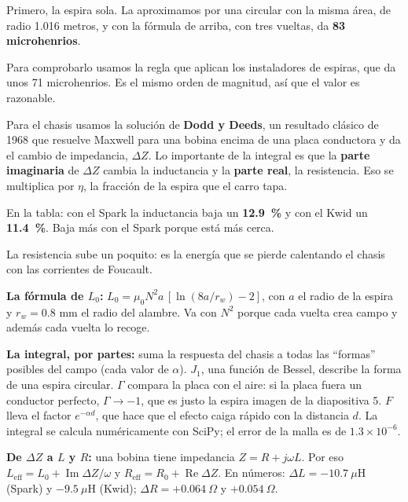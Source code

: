 \documentclass[11pt,a4paper]{article}
\begin{document}
Primero, la espira sola. La aproximamos por una circular con la misma área, de radio 1.016 metros, y con la
fórmula de arriba, con tres vueltas, da \textbf{83 microhenrios}.

\begin{opcional}
Para comprobarlo usamos la regla que aplican los instaladores de espiras, que da unos 71 microhenrios. Es el mismo
orden de magnitud, así que el valor es razonable.
\end{opcional}

Para el chasis usamos la solución de \textbf{Dodd y Deeds}, un resultado clásico de 1968 que resuelve Maxwell para
una bobina encima de una placa conductora y da el cambio de impedancia, $\Delta Z$. Lo importante de la integral es
que la \textbf{parte imaginaria} de $\Delta Z$ cambia la inductancia y la \textbf{parte real}, la resistencia. Eso
se multiplica por $\eta$, la fracción de la espira que el carro tapa.

En la tabla: con el Spark la inductancia baja un \textbf{12.9~\%} y con el Kwid un \textbf{11.4~\%}. Baja más con
el Spark porque está más cerca.

\begin{opcional}
La resistencia sube un poquito: es la energía que se pierde calentando el chasis con las corrientes de Foucault.
\end{opcional}

\begin{nota}
\textbf{La fórmula de $L_0$:} $L_0=\mu_0N^2a\,[\ln(8a/r_w)-2]$, con $a$ el radio de la espira y $r_w = 0.8$ mm el
radio del alambre. Va con $N^2$ porque cada vuelta crea campo y además cada vuelta lo recoge.

\textbf{La integral, por partes:} suma la respuesta del chasis a todas las ``formas'' posibles del campo (cada
valor de $\alpha$). $J_1$, una función de Bessel, describe la forma de una espira circular. $\Gamma$ compara la
placa con el aire: si la placa fuera un conductor perfecto, $\Gamma \to -1$, que es justo la espira imagen de la
diapositiva 5. $F$ lleva el factor $e^{-\alpha d}$, que hace que el efecto caiga rápido con la distancia $d$. La
integral se calcula numéricamente con SciPy; el error de la malla es de $1.3\times10^{-6}$.

\textbf{De $\Delta Z$ a $L$ y $R$:} una bobina tiene impedancia $Z = R + j\omega L$. Por eso
$L_\text{eff} = L_0 + \operatorname{Im}\Delta Z/\omega$ y $R_\text{eff} = R_0 + \operatorname{Re}\Delta Z$. En
números: $\Delta L = -10.7~\mu$H (Spark) y $-9.5~\mu$H (Kwid); $\Delta R = +0.064~\Omega$ y $+0.054~\Omega$.
\end{nota}
\end{document}

